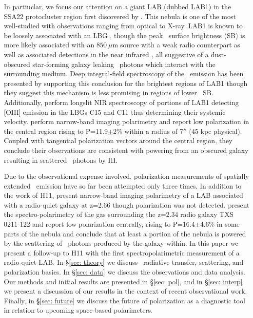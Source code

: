 In partiuclar, we focus our attention on a giant LAB (dubbed LAB1) in the SSA22 protocluster region first discovered by \cite{Steidel2000}.  This nebula is one of the most well-studied with observations ranging from optical to X-ray.  LAB1 is known to be loosely associated with an LBG \citep[C11,][]{Steidel2000, Matsuda2004},  though the peak \lya~surface brightness (SB) is more likely associated with an $850~\mu$m source \citep{Geach2014} with a weak radio counterpart \citep{Chapman2004} as well as associated detections in the near infrared \citep{Geach2007}, all suggestive of a dust-obscured star-forming galaxy leaking \lya~photons which interact with the surrounding medium. Deep integral-field spectroscopy of the \lya~emission has been presented by \citet{Weijmans2010} supporting this conclusion for the brightest regions of LAB1 though they suggest this mechanism is less promising in regions of lower \lya~SB. Additionally, \cite{McLinden2013} perform longslit NIR spectroscopy of portions of LAB1 detecting [OIII] emission in the LBGs C15 and C11 thus determining their systemic velocity.  
\citet[hereafter H11]{HayesScarlata2011} perform narrow-band imaging polarimetry and report low polarization in the central region rising to P=11.9$\pm$2\% within a radius of 7$''$ (45 kpc physical). Coupled with tangential polarization vectors around the central region, they conclude their observations are consistent with powering from an obscured galaxy resulting in scattered \lya~photons by HI.

Due to the observational expense involved, polarization measurements of spatially extended \lya~emission have so far been attempted only three times. In addition to the work of H11, \cite{Prescott2011} present narrow-band imaging polarimetry of a LAB associated with a radio-quiet galaxy at z=2.66 though polarization was not detected.  \cite{Humphrey2013} present the spectro-polarimetry of the gas surrounding the z=2.34 radio galaxy TXS 0211-122 and report low polarization centrally, rising to P=16.4$\pm$4.6\% in some parts of the nebula and conclude that at least a portion of the nebula is powered by the scattering of \lya ~photons produced by the galaxy within.  In this paper we present a follow-up to H11 with the first spectropolarimetric measurement of a radio-quiet LAB.  
In \S\ref{sec: theory} we discuss \lya~radiative transfer, scattering, and polarization basics. In \S\ref{sec: data} we discuss the observations and data analysis. Our methods and initial results are presented in \S\ref{sec: pol}, and in \S\ref{sec: interp} we present a discussion of our results in the context of recent observational work. Finally, in \S\ref{sec: future} we discuss the future of polarization as a diagnostic tool in relation to upcoming space-based polarimeters. 

